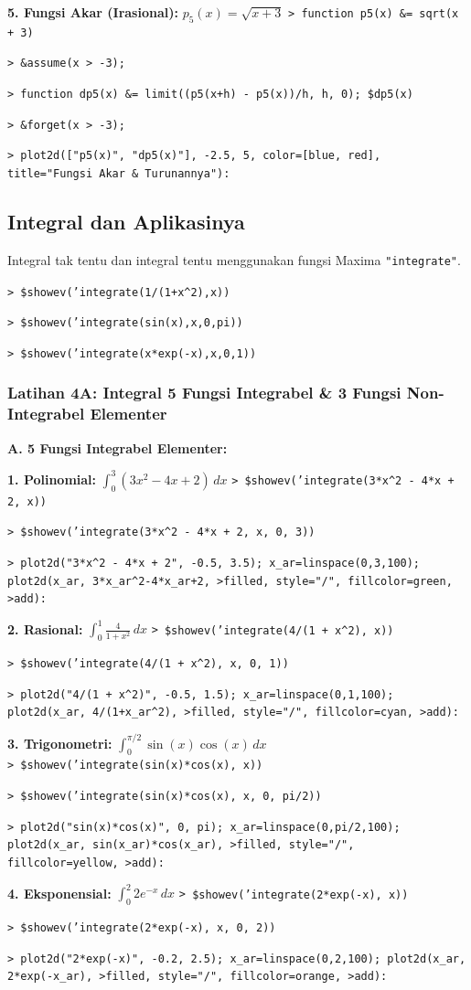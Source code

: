 \documentclass[11pt, a4paper]{article}
\newcommand{\emtcmd}[1]{\noindent\texttt{\textcolor{emtcommand}{>}\ #1}\par\smallskip}
\begin{document}
\textbf{5. Fungsi Akar (Irasional):} $p_5(x) = \sqrt{x + 3}$
\emtcmd{function p5(x) \&= sqrt(x + 3)}
\emtcmd{\&assume(x > -3);}
\emtcmd{function dp5(x) \&= limit((p5(x+h) - p5(x))/h, h, 0); \$dp5(x)}
\emtcmd{\&forget(x > -3);}
\emtcmd{plot2d(["p5(x)", "dp5(x)"], -2.5, 5, color=[blue, red], title="Fungsi Akar \& Turunannya"):}

\subsection*{Integral dan Aplikasinya}

Integral tak tentu dan integral tentu menggunakan fungsi Maxima \texttt{"integrate"}.

\emtcmd{\$showev('integrate(1/(1+x\^{}2),x))}
\emtcmd{\$showev('integrate(sin(x),x,0,pi))}
\emtcmd{\$showev('integrate(x*exp(-x),x,0,1))}

\subsubsection*{Latihan 4A: Integral 5 Fungsi Integrabel \& 3 Fungsi Non-Integrabel Elementer}

\textbf{A. 5 Fungsi Integrabel Elementer:}

\textbf{1. Polinomial:} $\int_0^3 (3x^2 - 4x + 2) \, dx$
\emtcmd{\$showev('integrate(3*x\^{}2 - 4*x + 2, x))}
\emtcmd{\$showev('integrate(3*x\^{}2 - 4*x + 2, x, 0, 3))}
\emtcmd{plot2d("3*x\^{}2 - 4*x + 2", -0.5, 3.5); x\_ar=linspace(0,3,100); plot2d(x\_ar, 3*x\_ar\^{}2-4*x\_ar+2, >filled, style="/", fillcolor=green, >add):}

\textbf{2. Rasional:} $\int_0^1 \frac{4}{1 + x^2} \, dx$
\emtcmd{\$showev('integrate(4/(1 + x\^{}2), x))}
\emtcmd{\$showev('integrate(4/(1 + x\^{}2), x, 0, 1))}
\emtcmd{plot2d("4/(1 + x\^{}2)", -0.5, 1.5); x\_ar=linspace(0,1,100); plot2d(x\_ar, 4/(1+x\_ar\^{}2), >filled, style="/", fillcolor=cyan, >add):}

\textbf{3. Trigonometri:} $\int_0^{\pi/2} \sin(x)\cos(x) \, dx$
\emtcmd{\$showev('integrate(sin(x)*cos(x), x))}
\emtcmd{\$showev('integrate(sin(x)*cos(x), x, 0, pi/2))}
\emtcmd{plot2d("sin(x)*cos(x)", 0, pi); x\_ar=linspace(0,pi/2,100); plot2d(x\_ar, sin(x\_ar)*cos(x\_ar), >filled, style="/", fillcolor=yellow, >add):}

\textbf{4. Eksponensial:} $\int_0^2 2e^{-x} \, dx$
\emtcmd{\$showev('integrate(2*exp(-x), x))}
\emtcmd{\$showev('integrate(2*exp(-x), x, 0, 2))}
\emtcmd{plot2d("2*exp(-x)", -0.2, 2.5); x\_ar=linspace(0,2,100); plot2d(x\_ar, 2*exp(-x\_ar), >filled, style="/", fillcolor=orange, >add):}
\end{document}
